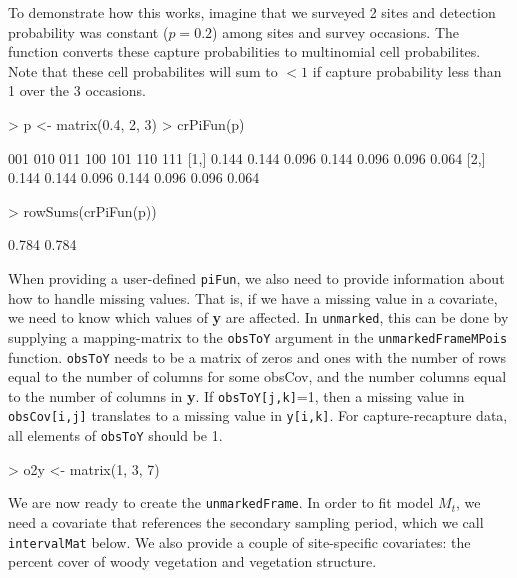 \documentclass[a4paper]{article}
\renewenvironment{Schunk}{\vspace{\topsep}}{\vspace{\topsep}}
\begin{document}
To demonstrate how this works, imagine that we surveyed 2 sites and
detection probability was constant ($p=0.2$) among sites and survey
occasions. The function converts these capture probabilities to
multinomial cell probabilites. Note that these cell probabilites will
sum to $< 1$ if capture probability less than 1 over the 3 occasions.

\begin{Schunk}
\begin{Sinput}
> p <- matrix(0.4, 2, 3)
> crPiFun(p)
\end{Sinput}
\begin{Soutput}
       001   010   011   100   101   110   111
[1,] 0.144 0.144 0.096 0.144 0.096 0.096 0.064
[2,] 0.144 0.144 0.096 0.144 0.096 0.096 0.064
\end{Soutput}
\begin{Sinput}
> rowSums(crPiFun(p))
\end{Sinput}
\begin{Soutput}
[1] 0.784 0.784
\end{Soutput}
\end{Schunk}

When providing a user-defined \texttt{piFun}, we also need to provide
information about how to handle missing values. That is, if we have a
missing value in a covariate, we need to know which values of {\bf y}
are affected. In \texttt{unmarked}, this can be done by supplying a
mapping-matrix to the \texttt{obsToY} argument in the
\texttt{unmarkedFrameMPois} function. \texttt{obsToY} needs to be a matrix
of zeros and ones with
the number of rows equal to the number of columns for some obsCov, and
the number columns equal to the number of columns in {\bf y}.
If \texttt{obsToY[j,k]}=1, then a missing value in {\tt obsCov[i,j]}
translates to
a missing value in {\tt y[i,k]}. For capture-recapture data, all
elements of
\texttt{obsToY} should be 1.

\begin{Schunk}
\begin{Sinput}
> o2y <- matrix(1, 3, 7)
\end{Sinput}
\end{Schunk}

We are now ready to create the \texttt{unmarkedFrame}. In order to fit
model $M_t$, we need a covariate that references the secondary sampling
period, which we call \texttt{intervalMat} below. We also provide a
couple of site-specific covariates: the percent cover of woody
vegetation and vegetation structure.
\end{document}
